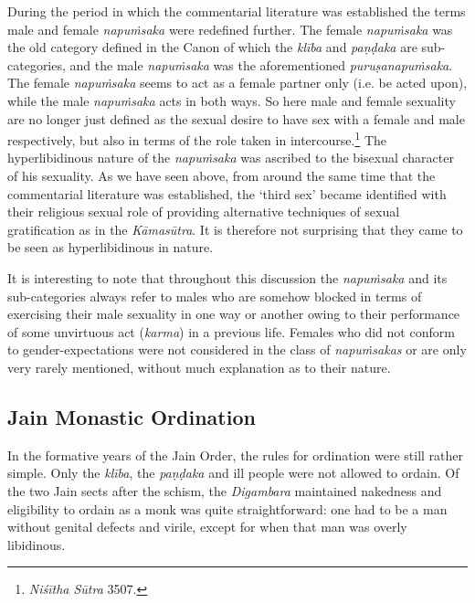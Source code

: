 During the period in which the commentarial literature was established the terms male and female {\em napuṁsaka} were redefined further. The female {\em napuṁsaka} was the old category defined in the Canon of which the {\em klība} and {\em paṇḍaka} are sub-categories, and the male {\em napuṁsaka} was the aforementioned {\em puruṣanapuṁsaka}. The female {\em napuṁsaka} seems to act as a female partner only (i.e. be acted upon), while the male {\em napuṁsaka} acts in both ways. So here male and female sexuality are no longer just defined as the sexual desire to have sex with a female and male respectively, but also in terms of the role taken in intercourse.\footnote{{\em Niśītha Sūtra} 3507.} The hyperlibidinous nature of the {\em napuṁsaka} was ascribed to the bisexual character of his sexuality. As we have seen above, from around the same time that the commentarial literature was established, the `third sex' became identified with their religious sexual role of providing alternative techniques of sexual gratification as in the {\em Kāmasūtra}. It is therefore not surprising that they came to be seen as hyperlibidinous in nature.

It is interesting to note that throughout this discussion the {\em napuṁsaka} and its sub-categories always refer to males who are somehow blocked in terms of exercising their male sexuality in one way or another owing to their performance of some unvirtuous act ({\em karma}) in a previous life. Females who did not conform to gender-expectations were not considered in the class of {\em napuṁsakas} or are only very rarely mentioned, without much explanation as to their nature. 

\subsection{Jain Monastic Ordination}
In the formative years of the Jain Order, the rules for ordination were still rather simple. Only the {\em klība}, the {\em paṇḍaka} and ill people were not allowed to ordain. Of the two Jain sects after the schism, the {\em Digambara} maintained nakedness and eligibility to ordain as a monk was quite straightforward: one had to be a man without genital defects and virile, except for when that man was overly libidinous. 

